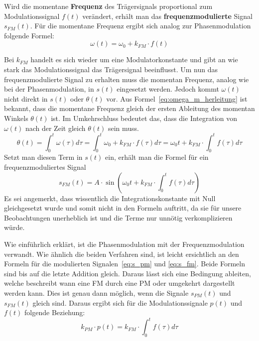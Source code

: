 Wird die momentane \textbf{Frequenz} des Trägersignals proportional zum Modulationssignal \(f(t)\) verändert, erhält man das \textbf{frequenzmodulierte} Signal \(s_{FM}(t)\). \cite[S. 210]{lathi} Für die momentane Frequenz ergibt sich analog zur Phasenmodulation folgende Formel:
\begin{equation}
\omega(t)=\omega_0+k_{FM}\cdot f(t)
\label{eq:omega_m}
\end{equation}

Bei \(k_{FM}\) handelt es sich wieder um eine Modulatorkonstante und gibt an wie stark das Modulationssignal das Trägersignal beeinflusst. Um nun das frequenzmodulierte Signal zu erhalten muss die momentan Frequenz, analog wie bei der Phasenmodulation, in \(s(t)\) eingesetzt werden. Jedoch kommt \(\omega(t)\) nicht direkt in \(s(t)\) oder \(\theta(t)\) vor. Aus Formel~\ref{eq:omega_m_herleitung} ist bekannt, dass die momentane Frequenz gleich der ersten Ableitung des momentan Winkels \(\theta(t)\) ist. Im Umkehrschluss bedeutet das, dass die Integration von \(\omega(t)\) nach der Zeit gleich \(\theta(t)\) sein muss.
\begin{equation*}
\theta(t)=\int_0^t{\omega(\tau)} d\tau = \int_0^t{\omega_0 + k_{FM}\cdot f(\tau)} d\tau = \omega_0t + k_{FM} \cdot \int_0^t{f(\tau)} d\tau
\end{equation*}
Setzt man diesen Term in \(s(t)\) ein, erhält man die Formel für ein frequenzmoduliertes Signal
\begin{equation}
s_{FM}(t)=A\cdot\sin(\omega_0t + k_{FM} \cdot \int_0^t{f(\tau)} d\tau)
\label{eq:s_fm}
\end{equation}
Es sei angemerkt, dass wissentlich die Integrationskonstante mit Null gleichgesetzt wurde und somit nicht in den Formeln auftritt, da sie für unsere Beobachtungen unerheblich ist und die Terme nur unnötig verkomplizieren würde.

Wie einführlich erklärt, ist die Phasenmodulation mit der Frequenzmodulation verwandt. Wie ähnlich die beiden Verfahren sind, ist leicht ersichtlich an den Formeln für die modulierten Signalen~\ref{eq:s_pm} und \ref{eq:s_fm}. Beide Formeln sind bis auf die letzte Addition gleich. Daraus lässt sich eine Bedingung ableiten, welche beschreibt wann eine FM durch eine PM oder umgekehrt dargestellt werden kann. Dies ist genau dann möglich, wenn die Signale \(s_{PM}(t)\) und \(s_{FM}(t)\) gleich sind. Daraus ergibt sich für die Modulationssignale \(p(t)\) und \(f(t)\) folgende Beziehung:
\begin{equation}
k_{PM}\cdot p(t)=k_{FM} \cdot  \int_0^t{f(\tau)} d\tau
\end{equation}

